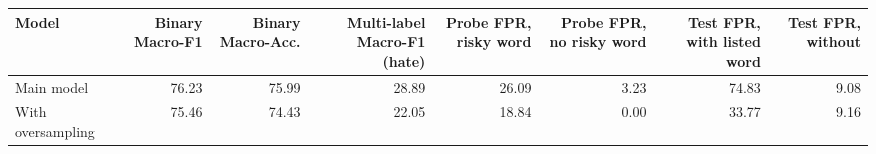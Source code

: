 \begin{tabular}{lrrrrrrr}
\toprule
Model & Binary Macro-F1 & Binary Macro-Acc. & Multi-label Macro-F1 (hate) & Probe FPR, risky word & Probe FPR, no risky word & Test FPR, with listed word & Test FPR, without \\
\midrule
Main model & 76.23 & 75.99 & 28.89 & 26.09 & 3.23 & 74.83 & 9.08 \\
With oversampling & 75.46 & 74.43 & 22.05 & 18.84 & 0.00 & 33.77 & 9.16 \\
\bottomrule
\end{tabular}
